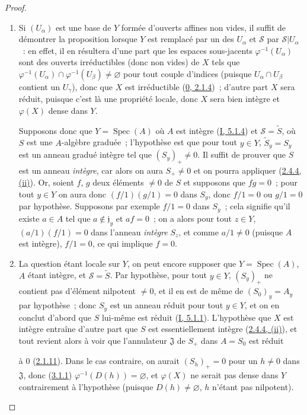 \begin{proof}
\begin{enumerate}
  \item[\rm(i)] Si $(U_\alpha)$ est une base de $Y$ formée d'ouverts affines
    non vides, il suffit de démontrer la proposition lorsque $Y$ est remplacé
    par un des $U_\alpha$ et $\mathcal{S}$ par $\mathcal{S}|U_\alpha$~: en
    effet, il en résultera d'une part que les espaces sous-jacents
    $\varphi^{-1}(U_\alpha)$ sont des ouverts irréductibles (donc non vides)
    de $X$ tels que
    $\varphi^{-1}(U_\alpha)\cap\varphi^{-1}(U_\beta)\neq\varnothing$ pour tout
    couple d'indices (puisque $U_\alpha\cap U_\beta$ contient un $U_\gamma$),
    donc que $X$ est irréductible (\hyperref[0.2.1.4-fr]{0, 2.1.4})~; d'autre
    part $X$ sera réduit, puisque c'est là une propriété locale, donc $X$
    sera bien intègre et $\varphi(X)$ dense dans $Y$.

    Supposons donc que $Y=\operatorname{Spec}(A)$ où $A$ est intègre
    (\hyperref[I.5.1.4-fr]{I, 5.1.4}) et $\mathcal{S}=\widetilde{S}$, où $S$
    est une $A$-algèbre graduée~; l'hypothèse est que pour tout $y\in Y$,
    $\widetilde{S}_y=S_y$ est un anneau gradué intègre tel que
    $(S_y)_+\neq0$. Il suffit de prouver que $S$ est un anneau \emph{intègre},
    car alors on aura $S_+\neq0$ et on pourra appliquer
    (\hyperref[II.2.4.4-fr]{2.4.4, (ii)}). Or, soient $f$, $g$ deux éléments
    $\neq0$ de $S$ et supposons que $fg=0$~; pour tout $y\in Y$ on aura donc
    $(f/1)(g/1)=0$ dans $S_y$, donc $f/1=0$ ou $g/1=0$ par hypothèse.
    Supposons par exemple $f/1=0$ dans $S_y$~; cela signifie qu'il existe
    $a\in A$ tel que $a\notin\mathfrak{j}_y$ et $af=0$~; on a alors pour tout
    $z\in Y$, $(a/1)(f/1)=0$ dans l'anneau \emph{intègre} $S_z$, et comme
    $a/1\neq0$ (puisque $A$ est intègre), $f/1=0$, ce qui implique $f=0$.
  \item[\rm(ii)] La question étant locale sur $Y$, on peut encore supposer
    que $Y=\operatorname{Spec}(A)$, $A$ étant intègre, et
    $\mathcal{S}=\widetilde{S}$. Par hypothèse, pour tout $y\in Y$, $(S_y)_+$
    ne contient pas d'élément nilpotent $\neq0$, et il en est de même de
    $(S_0)_y=A_y$ par hypothèse~; donc $S_y$ est un anneau réduit pour tout
    $y\in Y$, et on en conclut d'abord que $S$ lui-même est réduit
    (\hyperref[I.5.1.1-fr]{I, 5.1.1}). L'hypothèse que $X$ est intègre
    entraîne d'autre part que $S$ est essentiellement intègre
    (\hyperref[II.2.4.4-fr]{2.4.4, (ii)}), et tout revient alors à voir que
    l'annulateur $\mathfrak{J}$ de $S_+$ dans $A=S_0$ est réduit


    à $0$
    (\hyperref[II.2.1.11-fr]{2.1.11}). Dans le cas contraire, on aurait
    $(S_h)_+=0$ pour un $h\neq0$ dans $\mathfrak{J}$, donc
    (\hyperref[II.3.1.1-fr]{3.1.1}) $\varphi^{-1}(D(h))=\varnothing$, et
    $\varphi(X)$ ne serait pas dense dans $Y$ contrairement à l'hypothèse
    (puisque $D(h)\neq\varnothing$, $h$ n'étant pas nilpotent).
\end{enumerate}
\end{proof}

